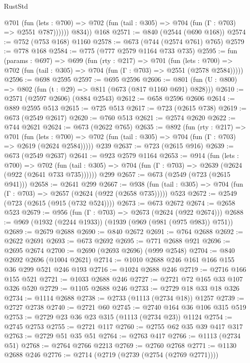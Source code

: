 \begin{lexlean}{RustStd}
\begin{coremodule}
            @701
              (fun (lets : @700) =>
              @702 (fun (tail : @305) => @704 (fun (Γ : @703) => @2551 @787))))))
        @834))
    @168
@2571 := @840 (@2544 (@690 @168))
@2574 := @752 (@753 @168) @1160
@2578 := @673 (@744 (@2574 @761) @765)
@2579 := @778 @168
@2584 := @775 (@777 @2579 @1164 @733 @735)
@2595 := fun (params : @697) =>
  @699
    (fun (rty : @217) =>
    @701
      (fun (lets : @700) =>
      @702 (fun (tail : @305) => @704 (fun (Γ : @703) => @2551 (@2578 @2584)))))
@2596 := @698 @2595
@2597 := @695 @2596
@2606 := @801 (fun (U : @800) => @802 (fun (t : @29) => @811 (@673 (@817 @1160 @691) @828)))
@2610 := @2571 (@2597 @2606) (@884 @2543)
@2612 := @658 @2596 @2606
@2614 := @889 @2595 @513
@2615 := @725 @513
@2617 := @723 (@2615 @738)
@2619 := @673 (@2549 @2617)
@2620 := @760 @513
@2621 := @2574 @2620
@2622 := @744 @2621
@2624 := @673 (@2622 @765)
@2635 := @892
    (fun (rty : @217) =>
    @701
      (fun (lets : @700) =>
      @702 (fun (tail : @305) => @704 (fun (Γ : @703) => @2619 (@2624 @2584)))))
    @239
@2637 := @723 (@2615 @916)
@2639 := @673 (@2549 @2637)
@2641 := @923 @2579 @1164
@2653 := @914
    (fun (lets : @700) =>
    @702 (fun (tail : @305) => @704 (fun (Γ : @703) => @2639 (@2624 (@922 (@2641 @733 @735))))))
    @299
@2657 := @673 (@2549 (@723 (@2615 @941)))
@2658 := @2641 @299
@2667 := @938 (fun (tail : @305) => @704 (fun (Γ : @703) => @2657 (@2624 (@922 (@2658 @735))))) @523
@2672 := @2549 (@723 (@2615 (@915 (@732 @524))))
@2673 := @673 @2672
@2674 := @2658 @523
@2679 := @956 (fun (Γ : @703) => @2673 (@2624 (@922 @2674)))
@2688 := @969 (@1932 (@2244 @1933)) (@1939 (@969 (@981 (@975 @983)) @751))
@2689 := @2679 @2688
@2690 := @840 @2672
@2691 := @764 @2688
@2692 := @2622 @2691
@2693 := @673 @2692
@2695 := @771 @2688 @921
@2696 := @2695 @2674
@2700 := @2690 (@2693 @2696) (@999 @2548)
@2704 := @840 @2692 @2696 (@1004 @2621)
@2714 := @1010 @2688 @246 @161 @166 @155 @36 @299 @521 @246 @193
@2716 := @1024 @2688 @246
@2719 := @2716 @166 @155 @521
@2721 := @1033 @2688 @246
@2727 := @2721 @72 @165 @33 @107 @326 @520
@2729 := @1105 @2688 @246
@2733 := @2729 @18 @33 @18 @326
@2734 := @1114 @2688
@2738 := @2733 (@1113 (@2734 @18)) @1257
@2739 := @2727 @2738
@2740 := @2721 @60
@2745 := @2740 @164 @36 @106 @315 @519
@2753 := @2729 @23 @36 @23 @315 (@1113 (@2734 @23)) @1124
@2754 := @2745 @2753
@2755 := @2721 @117
@2760 := @2755 @62 @35 @39 @417 @317
@2763 := @2729 @51 @35 @51
@2764 := @2763 @417
@2766 := @1113 (@2734 @51)
@2768 := @2764 @2766 @2213
@2769 := @2760 @2768
@2771 := @1130 @2688 @246
@2776 := @2714 (@2719 (@2739 (@2754 (@2769 @2771))))

\end{coremodule}
\end{lexlean}

